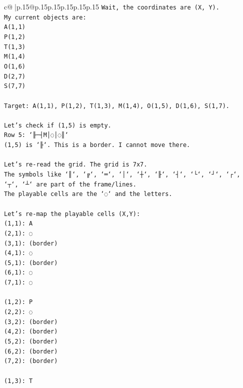 \documentclass{article}
\begin{document}
{\begin{supertabular}{c@{$\;$}|p{.15\linewidth}@{}p{.15\linewidth}p{.15\linewidth}p{.15\linewidth}p{.15\linewidth}p{.15\linewidth}}
{{{\texttt{Wait, the coordinates are (X, Y).} \\
\texttt{My current objects are:} \\
\texttt{A(1,1)} \\
\texttt{P(1,2)} \\
\texttt{T(1,3)} \\
\texttt{M(1,4)} \\
\texttt{O(1,6)} \\
\texttt{D(2,7)} \\
\texttt{S(7,7)} \\
\\ 
\texttt{Target: A(1,1), P(1,2), T(1,3), M(1,4), O(1,5), D(1,6), S(1,7).} \\
\\ 
\texttt{Let's check if (1,5) is empty.} \\
\texttt{Row 5: `╟─┤M│◌│◌║`} \\
\texttt{(1,5) is `╟`. This is a border. I cannot move there.} \\
\\ 
\texttt{Let's re{-}read the grid. The grid is 7x7.} \\
\texttt{The symbols like `║`, `╔`, `═`, `│`, `┼`, `╟`, `┤`, `└`, `┘`, `┌`, `┬`, `┴` are part of the frame/lines.} \\
\texttt{The playable cells are the `◌` and the letters.} \\
\\ 
\texttt{Let's re{-}map the playable cells (X,Y):} \\
\texttt{(1,1): A} \\
\texttt{(2,1): ◌} \\
\texttt{(3,1): (border)} \\
\texttt{(4,1): ◌} \\
\texttt{(5,1): (border)} \\
\texttt{(6,1): ◌} \\
\texttt{(7,1): ◌} \\
\\ 
\texttt{(1,2): P} \\
\texttt{(2,2): ◌} \\
\texttt{(3,2): (border)} \\
\texttt{(4,2): (border)} \\
\texttt{(5,2): (border)} \\
\texttt{(6,2): (border)} \\
\texttt{(7,2): (border)} \\
\\ 
\texttt{(1,3): T} \\
}}}
\end{supertabular}}
\end{document}
